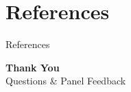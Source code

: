 \documentclass[aspectratio=169, 11pt]{beamer}
\begin{document}
\section{References}
\begin{frame}[allowframebreaks]{References}
    \scriptsize
    \nocite{*}
    
    
\end{frame}

\begin{frame}
    \centering
    \vspace{0.8cm}
    {\Huge\textbf{\textcolor{amritaMaroon}{Thank You}}}\\[0.7cm]
    {\footnotesize\textcolor{amritaSlate}{Questions \& Panel Feedback}}
\end{frame}
\end{document}
